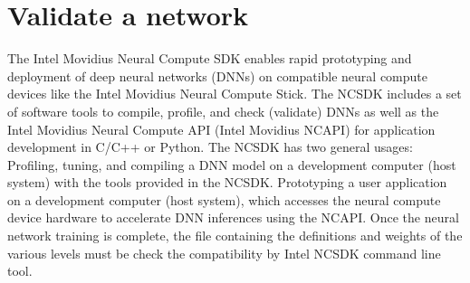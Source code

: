 \section{Validate a network}
\label{sec:checknetwork}
The Intel Movidius Neural Compute SDK enables rapid prototyping and deployment 
of deep neural networks (DNNs) on compatible neural compute devices like the 
Intel Movidius Neural Compute Stick. 
The NCSDK includes a set of software tools to compile, profile, and check 
(validate) DNNs as well as the Intel Movidius Neural Compute API (Intel 
Movidius NCAPI) for application development in C/C++ or Python.
The NCSDK has two general usages:
Profiling, tuning, and compiling a DNN model on a development computer 
(host system) with the tools provided in the NCSDK.
Prototyping a user application on a development computer (host system), 
which accesses the neural compute device hardware to accelerate DNN inferences 
using the NCAPI. 
Once the neural network training is complete, the file containing the 
definitions and weights of the various levels must be check the compatibility 
by Intel NCSDK command line tool.
%
